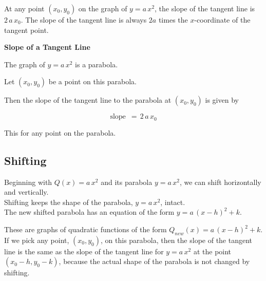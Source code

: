 \documentclass{ximera}
\begin{document}
At any point $(x_0, y_0)$ on the graph of $y = a \, x^2$, the slope of the tangent line is $2 \, a \, x_0$.  The slope of the tangent line is always $2a$ times the $x$-coordinate of the tangent point.










\begin{conclusion} \textbf{\textcolor{green!50!black}{Slope of a Tangent Line}} 


The graph of $y = a \, x^2$ is a parabola.

Let $(x_0, y_0)$ be a point on this parabola.

Then the slope of the tangent line to the parabola at $(x_0, y_0)$ is given by 



\[ \text{slope } \, = \, 2 \, a \, x_0  \]


\end{conclusion}
This for any point on the parabola.




















\subsection*{Shifting}




Beginning with $Q(x) = a \, x^2$ and its parabola $y = a \, x^2$, we can shift horizontally and vertically. \\





Shifting keeps the shape of the parabola, $y = a \, x^2$, intact. \\


The new shifted parabola has an equation of the form $y = a \, (x - h)^2 + k$.

These are graphs of quadratic functions of the form $Q_{new}(x) = a \, (x - h)^2 + k$. \\


If we pick any point, $(x_0, y_0)$, on this parabola, then the slope of the tangent line is the same as the slope of the tangent line for $y = a \, x^2$ at the point $(x_0 - h, y_0 - k)$, because the actual shape of the parabola is not changed by shifting.  \\
\end{document}
